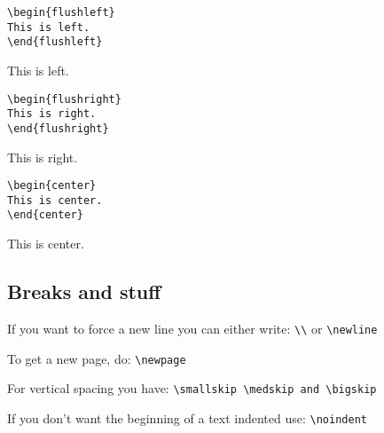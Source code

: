 \begin{verbatim}
\begin{flushleft}
This is left.
\end{flushleft}
\end{verbatim}

\begin{flushleft}
This is left.
\end{flushleft}

\begin{verbatim}
\begin{flushright}
This is right.
\end{flushright}
\end{verbatim}

\begin{flushright}
This is right.
\end{flushright}

\begin{verbatim}
\begin{center}
This is center.
\end{center}
\end{verbatim}

\begin{center}
This is center.
\end{center}

\subsection{Breaks and stuff}

If you want to force a new line you can either write: \verb+\\+ or
\verb+\newline+ 

To get a new page, do: \verb+\newpage+ 

For vertical spacing you have: \verb+\smallskip \medskip and \bigskip+ 

If you don't want the beginning of a text indented use: \verb+\noindent+
